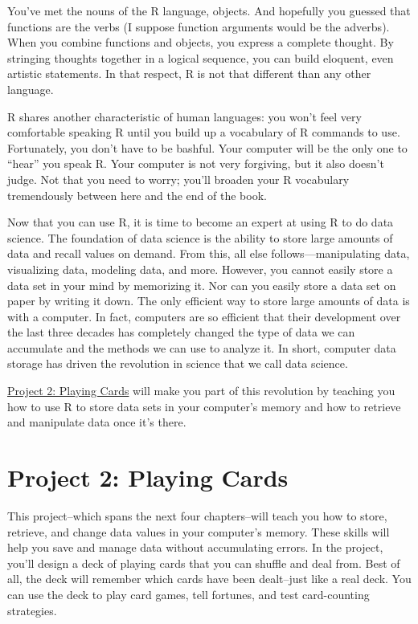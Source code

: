 \documentclass[
  letterpaper,
  DIV=11,
  numbers=noendperiod]{scrbook}
\begin{document}
You've met the nouns of the R language, objects. And hopefully you
guessed that functions are the verbs (I suppose function arguments would
be the adverbs). When you combine functions and objects, you express a
complete thought. By stringing thoughts together in a logical sequence,
you can build eloquent, even artistic statements. In that respect, R is
not that different than any other language.

R shares another characteristic of human languages: you won't feel very
comfortable speaking R until you build up a vocabulary of R commands to
use. Fortunately, you don't have to be bashful. Your computer will be
the only one to ``hear'' you speak R. Your computer is not very
forgiving, but it also doesn't judge. Not that you need to worry; you'll
broaden your R vocabulary tremendously between here and the end of the
book.

Now that you can use R, it is time to become an expert at using R to do
data science. The foundation of data science is the ability to store
large amounts of data and recall values on demand. From this, all else
follows---manipulating data, visualizing data, modeling data, and more.
However, you cannot easily store a data set in your mind by memorizing
it. Nor can you easily store a data set on paper by writing it down. The
only efficient way to store large amounts of data is with a computer. In
fact, computers are so efficient that their development over the last
three decades has completely changed the type of data we can accumulate
and the methods we can use to analyze it. In short, computer data
storage has driven the revolution in science that we call data science.

\hyperref[sec-project-cards]{Project 2: Playing Cards} will make you
part of this revolution by teaching you how to use R to store data sets
in your computer's memory and how to retrieve and manipulate data once
it's there.

\part{Project 2: Playing Cards}

This project--which spans the next four chapters--will teach you how to
store, retrieve, and change data values in your computer's memory. These
skills will help you save and manage data without accumulating errors.
In the project, you'll design a deck of playing cards that you can
shuffle and deal from. Best of all, the deck will remember which cards
have been dealt--just like a real deck. You can use the deck to play
card games, tell fortunes, and test card-counting strategies.
\end{document}
